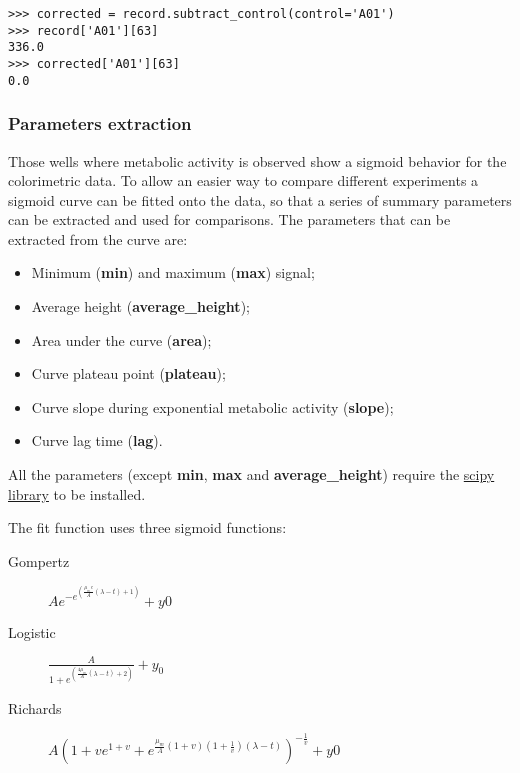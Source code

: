 \begin{verbatim}
>>> corrected = record.subtract_control(control='A01')
>>> record['A01'][63]
336.0
>>> corrected['A01'][63]
0.0
\end{verbatim}

\subsubsection{Parameters extraction}
Those wells where metabolic activity is observed show a sigmoid behavior for the colorimetric data.
To allow an easier way to compare different experiments a sigmoid curve can be fitted onto the data,
so that a series of summary parameters can be extracted and used for comparisons.
The parameters that can be extracted from the curve are:

\begin{itemize}
  \item Minimum (\textbf{min}) and maximum (\textbf{max}) signal;

  \item Average height (\textbf{average\_height});

  \item Area under the curve (\textbf{area});

  \item Curve plateau point (\textbf{plateau});

  \item Curve slope during exponential metabolic activity (\textbf{slope});

  \item Curve lag time (\textbf{lag}).
\end{itemize}

All the parameters (except \textbf{min}, \textbf{max} and \textbf{average\_height}) require the
\href{http://www.scipy.org/}{scipy library} to be installed.

The fit function uses three sigmoid functions:

\begin{description}
  \item[Gompertz] $Ae^{-e^{(\frac{\mu_{m}e}{A}(\lambda - t) + 1)}} + y0$

  \item[Logistic] $\frac{A}{1+e^{(\frac{4\mu_{m}}{A}(\lambda - t) + 2)}} + y_{0}$

  \item[Richards] $A(1 + ve^{1 + v} + e^{\frac{\mu_{m}}{A}(1 + v)(1 + \frac{1}{v})(\lambda - t)})^{-\frac{1}{v}} + y0$

\end{description} 

